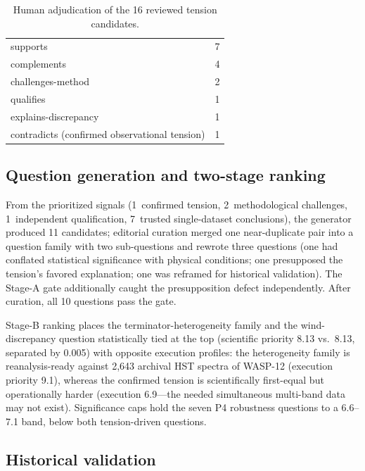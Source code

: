 \begin{table}[t]
  \centering
  \caption{Human adjudication of the 16 reviewed tension candidates.}
  \label{tab:adjudication}
  \begin{tabular}{lr}
    \toprule
    supports & 7 \\
    complements & 4 \\
    challenges-method & 2 \\
    qualifies & 1 \\
    explains-discrepancy & 1 \\
    contradicts (confirmed observational tension) & 1 \\
    \bottomrule
  \end{tabular}
\end{table}

\subsection{Question generation and two-stage ranking}
\label{sec:experiments:ranking}

From the prioritized signals (1~confirmed tension, 2~methodological
challenges, 1~independent qualification, 7~trusted single-dataset
conclusions), the generator produced 11 candidates; editorial curation
merged one near-duplicate pair into a question family with two
sub-questions and rewrote three questions (one had conflated statistical
significance with physical conditions; one presupposed the tension's
favored explanation; one was reframed for historical validation). The
Stage-A gate additionally caught the presupposition defect
independently. After curation, all 10 questions pass the gate.

Stage-B ranking places the terminator-heterogeneity family and the
wind-discrepancy question statistically tied at the top (scientific
priority 8.13 vs.\ 8.13, separated by 0.005) with opposite execution
profiles: the heterogeneity family is reanalysis-ready against 2{,}643
archival HST spectra of WASP-12 (execution priority 9.1), whereas the
confirmed tension is scientifically first-equal but operationally
harder (execution 6.9---the needed simultaneous multi-band data may not
exist). Significance caps hold the seven P4 robustness questions to a
6.6--7.1 band, below both tension-driven questions.

\subsection{Historical validation}
\label{sec:experiments:validation}

